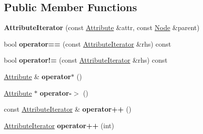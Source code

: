 \subsection*{Public Member Functions}
\begin{DoxyCompactItemize}
\item 
\hypertarget{classphys_1_1xml_1_1AttributeIterator_ae338589383381586c8d8e5d893e498be}{
{\bfseries AttributeIterator} (const \hyperlink{classphys_1_1xml_1_1Attribute}{Attribute} \&attr, const \hyperlink{classphys_1_1xml_1_1Node}{Node} \&parent)}
\label{de/d78/classphys_1_1xml_1_1AttributeIterator_ae338589383381586c8d8e5d893e498be}

\item 
\hypertarget{classphys_1_1xml_1_1AttributeIterator_a5310ea26bd19cb1c32e962c03ea0dc62}{
bool {\bfseries operator==} (const \hyperlink{classphys_1_1xml_1_1AttributeIterator}{AttributeIterator} \&rhs) const }
\label{de/d78/classphys_1_1xml_1_1AttributeIterator_a5310ea26bd19cb1c32e962c03ea0dc62}

\item 
\hypertarget{classphys_1_1xml_1_1AttributeIterator_a6b80c4c5317f97921511e25597a3403f}{
bool {\bfseries operator!=} (const \hyperlink{classphys_1_1xml_1_1AttributeIterator}{AttributeIterator} \&rhs) const }
\label{de/d78/classphys_1_1xml_1_1AttributeIterator_a6b80c4c5317f97921511e25597a3403f}

\item 
\hypertarget{classphys_1_1xml_1_1AttributeIterator_a75fd50f268f3083378bff933999979c9}{
\hyperlink{classphys_1_1xml_1_1Attribute}{Attribute} \& {\bfseries operator$\ast$} ()}
\label{de/d78/classphys_1_1xml_1_1AttributeIterator_a75fd50f268f3083378bff933999979c9}

\item 
\hypertarget{classphys_1_1xml_1_1AttributeIterator_a4baca2564631c3683a5865955c4c8150}{
\hyperlink{classphys_1_1xml_1_1Attribute}{Attribute} $\ast$ {\bfseries operator-\/$>$} ()}
\label{de/d78/classphys_1_1xml_1_1AttributeIterator_a4baca2564631c3683a5865955c4c8150}

\item 
\hypertarget{classphys_1_1xml_1_1AttributeIterator_a32ffe54fee5136f533dcdf4877223c7e}{
const \hyperlink{classphys_1_1xml_1_1AttributeIterator}{AttributeIterator} \& {\bfseries operator++} ()}
\label{de/d78/classphys_1_1xml_1_1AttributeIterator_a32ffe54fee5136f533dcdf4877223c7e}

\item 
\hypertarget{classphys_1_1xml_1_1AttributeIterator_a9925e89424ac0d02453df60b4a8f21a7}{
\hyperlink{classphys_1_1xml_1_1AttributeIterator}{AttributeIterator} {\bfseries operator++} (int)}
\label{de/d78/classphys_1_1xml_1_1AttributeIterator_a9925e89424ac0d02453df60b4a8f21a7}


\end{DoxyCompactItemize}
